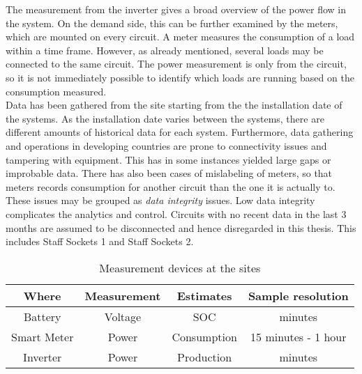 The measurement from the inverter gives a broad overview of the power flow in the system. On the demand side, this can be further examined by the meters, which are mounted on every circuit. A meter measures the consumption of a load within a time frame. However, as already mentioned, several loads may be connected to the same circuit. The power measurement is only from the circuit, so it is not immediately possible to identify which loads are running based on the consumption measured.\\

Data has been gathered from the site starting from the the installation date of the systems. As the installation date varies between the systems, there are different amounts of historical data for each system. Furthermore, data gathering and operations in developing countries are prone to connectivity issues and tampering with equipment. This has in some instances yielded large gaps or improbable data. There has also been cases of mislabeling of meters, so that meters records consumption for another circuit than the one it is actually to. These issues may be grouped as \textit{data integrity} issues. Low data integrity complicates the analytics and control. Circuits with no recent data in the last 3 months are assumed to be disconnected and hence disregarded in this thesis. This includes Staff Sockets 1 and Staff Sockets 2. 


\begin{table}[h]
    \centering
    \begin{tabular}{c|c|c|c}
        \textbf{Where} & \textbf{Measurement} & \textbf{Estimates} & \textbf{Sample resolution}\\
        \hline
         Battery & Voltage & SOC & minutes\\ 
         \hline
         Smart Meter & Power & Consumption & 15 minutes - 1 hour\\
         \hline 
         Inverter & Power & Production & minutes
    \end{tabular}
    \caption[Measurement devices]{Measurement devices at the sites}
    \label{tab:measurement_devices}
\end{table}


